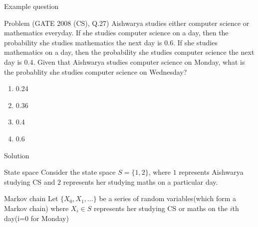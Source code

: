\documentclass{beamer}
\begin{document}
\begin{frame}{Example question}
\begin{block}{Problem (GATE 2008 (CS), Q.27)}
Aishwarya studies either computer science or mathematics everyday. If she studies computer science on a day, then the probability she studies mathematics the next day is 0.6. If she studies mathematics on a day, then the probability she studies computer science the next day is 0.4.
Given that Aishwarya studies computer science on Monday, what is the probablity she studies computer science on Wednesday?
\begin{enumerate}
\item 0.24
\item 0.36
\item 0.4
\item 0.6
\end{enumerate}
\end{block}    
\end{frame}
\begin{frame}{Solution}
\begin{block}{State space}
Consider the state space $S=\{1,2\}$, where $1$ represents Aishwarya studying CS and $2$ represents her studying maths on a particular day.
\end{block}
\begin{block}{Markov chain}
Let $\{X_0, X_1, \dots\}$ be a series of random variables(which form a Markov chain) where $X_i \in S$ represents her studying CS or maths on the $i$th day(i=0 for Monday)
\end{block}
\end{frame}
\end{document}
